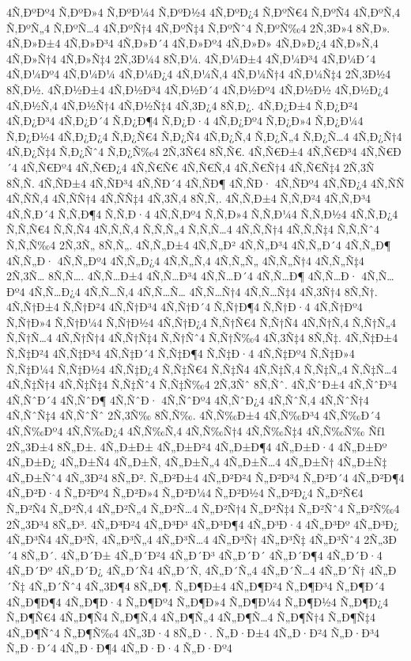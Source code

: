 {4Ñ‚ÐºÐº4
Ñ‚ÐºÐ»4
Ñ‚ÐºÐ¼4
Ñ‚ÐºÐ½4
4Ñ‚ÐºÐ¿4
Ñ‚ÐºÑ€4
Ñ‚ÐºÑ4
4Ñ‚ÐºÑ‚4
Ñ‚ÐºÑ„4
Ñ‚ÐºÑ…4
4Ñ‚ÐºÑ†4
4Ñ‚ÐºÑ‡4
Ñ‚ÐºÑˆ4
Ñ‚ÐºÑ‰4
2Ñ‚3Ð»4
8Ñ‚Ð».
4Ñ‚Ð»Ð±4
4Ñ‚Ð»Ð³4
4Ñ‚Ð»Ð´4
4Ñ‚Ð»Ðº4
4Ñ‚Ð»Ð»
4Ñ‚Ð»Ð¿4
4Ñ‚Ð»Ñ‚4
4Ñ‚Ð»Ñ†4
4Ñ‚Ð»Ñ‡4
2Ñ‚3Ð¼4
8Ñ‚Ð¼.
4Ñ‚Ð¼Ð±4
4Ñ‚Ð¼Ð³4
4Ñ‚Ð¼Ð´4
4Ñ‚Ð¼Ðº4
4Ñ‚Ð¼Ð¼
4Ñ‚Ð¼Ð¿4
4Ñ‚Ð¼Ñ‚4
4Ñ‚Ð¼Ñ†4
4Ñ‚Ð¼Ñ‡4
2Ñ‚3Ð½4
8Ñ‚Ð½.
4Ñ‚Ð½Ð±4
4Ñ‚Ð½Ð³4
4Ñ‚Ð½Ð´4
4Ñ‚Ð½Ðº4
4Ñ‚Ð½Ð½
4Ñ‚Ð½Ð¿4
4Ñ‚Ð½Ñ‚4
4Ñ‚Ð½Ñ†4
4Ñ‚Ð½Ñ‡4
4Ñ‚3Ð¿4
8Ñ‚Ð¿.
4Ñ‚Ð¿Ð±4
Ñ‚Ð¿Ð²4
4Ñ‚Ð¿Ð³4
4Ñ‚Ð¿Ð´4
Ñ‚Ð¿Ð¶4
Ñ‚Ð¿Ð·4
4Ñ‚Ð¿Ðº4
Ñ‚Ð¿Ð»4
Ñ‚Ð¿Ð¼4
Ñ‚Ð¿Ð½4
4Ñ‚Ð¿Ð¿4
Ñ‚Ð¿Ñ€4
Ñ‚Ð¿Ñ4
4Ñ‚Ð¿Ñ‚4
Ñ‚Ð¿Ñ„4
Ñ‚Ð¿Ñ…4
4Ñ‚Ð¿Ñ†4
4Ñ‚Ð¿Ñ‡4
Ñ‚Ð¿Ñˆ4
Ñ‚Ð¿Ñ‰4
2Ñ‚3Ñ€4
8Ñ‚Ñ€.
4Ñ‚Ñ€Ð±4
4Ñ‚Ñ€Ð³4
4Ñ‚Ñ€Ð´4
4Ñ‚Ñ€Ðº4
4Ñ‚Ñ€Ð¿4
4Ñ‚Ñ€Ñ€
4Ñ‚Ñ€Ñ‚4
4Ñ‚Ñ€Ñ†4
4Ñ‚Ñ€Ñ‡4
2Ñ‚3Ñ
8Ñ‚Ñ.
4Ñ‚ÑÐ±4
4Ñ‚ÑÐ³4
4Ñ‚ÑÐ´4
4Ñ‚ÑÐ¶
4Ñ‚ÑÐ·
4Ñ‚ÑÐº4
4Ñ‚ÑÐ¿4
4Ñ‚ÑÑ
4Ñ‚ÑÑ‚4
4Ñ‚ÑÑ†4
4Ñ‚ÑÑ‡4
4Ñ‚3Ñ‚4
8Ñ‚Ñ‚.
4Ñ‚Ñ‚Ð±4
Ñ‚Ñ‚Ð²4
4Ñ‚Ñ‚Ð³4
4Ñ‚Ñ‚Ð´4
Ñ‚Ñ‚Ð¶4
Ñ‚Ñ‚Ð·4
4Ñ‚Ñ‚Ðº4
Ñ‚Ñ‚Ð»4
Ñ‚Ñ‚Ð¼4
Ñ‚Ñ‚Ð½4
4Ñ‚Ñ‚Ð¿4
Ñ‚Ñ‚Ñ€4
Ñ‚Ñ‚Ñ4
4Ñ‚Ñ‚Ñ‚4
Ñ‚Ñ‚Ñ„4
Ñ‚Ñ‚Ñ…4
4Ñ‚Ñ‚Ñ†4
4Ñ‚Ñ‚Ñ‡4
Ñ‚Ñ‚Ñˆ4
Ñ‚Ñ‚Ñ‰4
2Ñ‚3Ñ„
8Ñ‚Ñ„.
4Ñ‚Ñ„Ð±4
4Ñ‚Ñ„Ð²
4Ñ‚Ñ„Ð³4
4Ñ‚Ñ„Ð´4
4Ñ‚Ñ„Ð¶
4Ñ‚Ñ„Ð·
4Ñ‚Ñ„Ðº4
4Ñ‚Ñ„Ð¿4
4Ñ‚Ñ„Ñ‚4
4Ñ‚Ñ„Ñ„
4Ñ‚Ñ„Ñ†4
4Ñ‚Ñ„Ñ‡4
2Ñ‚3Ñ…
8Ñ‚Ñ….
4Ñ‚Ñ…Ð±4
4Ñ‚Ñ…Ð³4
4Ñ‚Ñ…Ð´4
4Ñ‚Ñ…Ð¶
4Ñ‚Ñ…Ð·
4Ñ‚Ñ…Ðº4
4Ñ‚Ñ…Ð¿4
4Ñ‚Ñ…Ñ‚4
4Ñ‚Ñ…Ñ…
4Ñ‚Ñ…Ñ†4
4Ñ‚Ñ…Ñ‡4
4Ñ‚3Ñ†4
8Ñ‚Ñ†.
4Ñ‚Ñ†Ð±4
Ñ‚Ñ†Ð²4
4Ñ‚Ñ†Ð³4
4Ñ‚Ñ†Ð´4
Ñ‚Ñ†Ð¶4
Ñ‚Ñ†Ð·4
4Ñ‚Ñ†Ðº4
Ñ‚Ñ†Ð»4
Ñ‚Ñ†Ð¼4
Ñ‚Ñ†Ð½4
4Ñ‚Ñ†Ð¿4
Ñ‚Ñ†Ñ€4
Ñ‚Ñ†Ñ4
4Ñ‚Ñ†Ñ‚4
Ñ‚Ñ†Ñ„4
Ñ‚Ñ†Ñ…4
4Ñ‚Ñ†Ñ†4
4Ñ‚Ñ†Ñ‡4
Ñ‚Ñ†Ñˆ4
Ñ‚Ñ†Ñ‰4
4Ñ‚3Ñ‡4
8Ñ‚Ñ‡.
4Ñ‚Ñ‡Ð±4
Ñ‚Ñ‡Ð²4
4Ñ‚Ñ‡Ð³4
4Ñ‚Ñ‡Ð´4
Ñ‚Ñ‡Ð¶4
Ñ‚Ñ‡Ð·4
4Ñ‚Ñ‡Ðº4
Ñ‚Ñ‡Ð»4
Ñ‚Ñ‡Ð¼4
Ñ‚Ñ‡Ð½4
4Ñ‚Ñ‡Ð¿4
Ñ‚Ñ‡Ñ€4
Ñ‚Ñ‡Ñ4
4Ñ‚Ñ‡Ñ‚4
Ñ‚Ñ‡Ñ„4
Ñ‚Ñ‡Ñ…4
4Ñ‚Ñ‡Ñ†4
4Ñ‚Ñ‡Ñ‡4
Ñ‚Ñ‡Ñˆ4
Ñ‚Ñ‡Ñ‰4
2Ñ‚3Ñˆ
8Ñ‚Ñˆ.
4Ñ‚ÑˆÐ±4
4Ñ‚ÑˆÐ³4
4Ñ‚ÑˆÐ´4
4Ñ‚ÑˆÐ¶
4Ñ‚ÑˆÐ·
4Ñ‚ÑˆÐº4
4Ñ‚ÑˆÐ¿4
4Ñ‚ÑˆÑ‚4
4Ñ‚ÑˆÑ†4
4Ñ‚ÑˆÑ‡4
4Ñ‚ÑˆÑˆ
2Ñ‚3Ñ‰
8Ñ‚Ñ‰.
4Ñ‚Ñ‰Ð±4
4Ñ‚Ñ‰Ð³4
4Ñ‚Ñ‰Ð´4
4Ñ‚Ñ‰Ðº4
4Ñ‚Ñ‰Ð¿4
4Ñ‚Ñ‰Ñ‚4
4Ñ‚Ñ‰Ñ†4
4Ñ‚Ñ‰Ñ‡4
4Ñ‚Ñ‰Ñ‰
Ñƒ1
2Ñ„3Ð±4
8Ñ„Ð±.
4Ñ„Ð±Ð±
4Ñ„Ð±Ð²4
4Ñ„Ð±Ð¶4
4Ñ„Ð±Ð·4
4Ñ„Ð±Ðº
4Ñ„Ð±Ð¿
4Ñ„Ð±Ñ4
4Ñ„Ð±Ñ‚
4Ñ„Ð±Ñ„4
4Ñ„Ð±Ñ…4
4Ñ„Ð±Ñ†
4Ñ„Ð±Ñ‡
4Ñ„Ð±Ñˆ4
4Ñ„3Ð²4
8Ñ„Ð².
Ñ„Ð²Ð±4
4Ñ„Ð²Ð²4
Ñ„Ð²Ð³4
Ñ„Ð²Ð´4
4Ñ„Ð²Ð¶4
4Ñ„Ð²Ð·4
Ñ„Ð²Ðº4
Ñ„Ð²Ð»4
Ñ„Ð²Ð¼4
Ñ„Ð²Ð½4
Ñ„Ð²Ð¿4
Ñ„Ð²Ñ€4
Ñ„Ð²Ñ4
Ñ„Ð²Ñ‚4
4Ñ„Ð²Ñ„4
Ñ„Ð²Ñ…4
Ñ„Ð²Ñ†4
Ñ„Ð²Ñ‡4
Ñ„Ð²Ñˆ4
Ñ„Ð²Ñ‰4
2Ñ„3Ð³4
8Ñ„Ð³.
4Ñ„Ð³Ð²4
4Ñ„Ð³Ð³
4Ñ„Ð³Ð¶4
4Ñ„Ð³Ð·4
4Ñ„Ð³Ðº
4Ñ„Ð³Ð¿
4Ñ„Ð³Ñ4
4Ñ„Ð³Ñ‚
4Ñ„Ð³Ñ„4
4Ñ„Ð³Ñ…4
4Ñ„Ð³Ñ†
4Ñ„Ð³Ñ‡
4Ñ„Ð³Ñˆ4
2Ñ„3Ð´4
8Ñ„Ð´.
4Ñ„Ð´Ð±
4Ñ„Ð´Ð²4
4Ñ„Ð´Ð³
4Ñ„Ð´Ð´
4Ñ„Ð´Ð¶4
4Ñ„Ð´Ð·4
4Ñ„Ð´Ðº
4Ñ„Ð´Ð¿
4Ñ„Ð´Ñ4
4Ñ„Ð´Ñ‚
4Ñ„Ð´Ñ„4
4Ñ„Ð´Ñ…4
4Ñ„Ð´Ñ†
4Ñ„Ð´Ñ‡
4Ñ„Ð´Ñˆ4
4Ñ„3Ð¶4
8Ñ„Ð¶.
Ñ„Ð¶Ð±4
4Ñ„Ð¶Ð²4
Ñ„Ð¶Ð³4
Ñ„Ð¶Ð´4
4Ñ„Ð¶Ð¶4
4Ñ„Ð¶Ð·4
Ñ„Ð¶Ðº4
Ñ„Ð¶Ð»4
Ñ„Ð¶Ð¼4
Ñ„Ð¶Ð½4
Ñ„Ð¶Ð¿4
Ñ„Ð¶Ñ€4
4Ñ„Ð¶Ñ4
Ñ„Ð¶Ñ‚4
4Ñ„Ð¶Ñ„4
4Ñ„Ð¶Ñ…4
Ñ„Ð¶Ñ†4
Ñ„Ð¶Ñ‡4
4Ñ„Ð¶Ñˆ4
Ñ„Ð¶Ñ‰4
4Ñ„3Ð·4
8Ñ„Ð·.
Ñ„Ð·Ð±4
4Ñ„Ð·Ð²4
Ñ„Ð·Ð³4
Ñ„Ð·Ð´4
4Ñ„Ð·Ð¶4
4Ñ„Ð·Ð·4
Ñ„Ð·Ðº4
}
